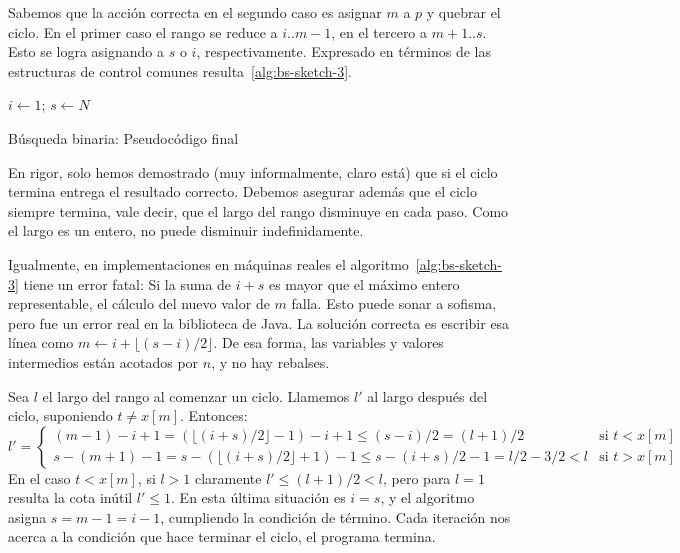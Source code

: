   \noindent
  Sabemos que la acción correcta
  en el segundo caso es asignar \(m\) a \(p\)
  y quebrar el ciclo.
  En el primer caso el rango se reduce a \(i .. m - 1\),
  en el tercero a \(m + 1 .. s\).
  Esto se logra asignando a \(s\) o \(i\),
  respectivamente.
  Expresado en términos de las estructuras de control comunes
  resulta~\ref{alg:bs-sketch-3}.
  \begin{algorithm}
    \DontPrintSemicolon
    \(i \leftarrow 1\); \(s \leftarrow N\) \;
    \caption{Búsqueda binaria: Pseudocódigo final}
    \label{alg:bs-sketch-3}
  \end{algorithm}
  En rigor,
  solo hemos demostrado
  (muy informalmente,
   claro está)
  que si el ciclo termina entrega el resultado correcto.
  Debemos asegurar además que el ciclo siempre termina,
  vale decir,
  que el largo del rango disminuye en cada paso.
  Como el largo es un entero,
  no puede disminuir indefinidamente.

  Igualmente,
  en implementaciones en máquinas reales
  el algoritmo~\ref{alg:bs-sketch-3}
  tiene un error fatal:
  Si la suma de \(i + s\)
  es mayor que el máximo entero representable,
  el cálculo del nuevo valor de \(m\) falla.
  Esto puede sonar a sofisma,
  pero fue un error real en la biblioteca de Java.
  La solución correcta es escribir esa línea como
  \(m \leftarrow i + \lfloor (s - i) / 2 \rfloor\).
  De esa forma,
  las variables y valores intermedios están acotados por \(n\),
  y no hay rebalses.

  Sea \(l\) el largo del rango al comenzar un ciclo.
  Llamemos \(l'\) al largo después del ciclo,
  suponiendo \(t \ne x[m]\).
  Entonces:
  \begin{equation*}
    l'
      = \begin{cases}
	  (m - 1) - i + 1
	    = (\lfloor (i + s) / 2 \rfloor - 1) - i + 1
	    \le (s - i) / 2
	    = (l + 1) / 2 & \text{si \(t < x[m]\)} \\
	  s - (m + 1) - 1
	    = s - (\lfloor (i + s) / 2 \rfloor + 1) - 1
	    \le s - (i + s) / 2 - 1
	    = l / 2 - 3 / 2
	    < l & \text{si \(t > x[m]\)}
	\end{cases}
  \end{equation*}
  En el caso \(t < x[m]\),
  si \(l > 1\) claramente \(l' \le (l + 1) / 2 < l\),
  pero para \(l = 1\) resulta la cota inútil \(l' \le 1\).
  En esta última situación
  es \(i = s\),
  y el algoritmo asigna \(s = m - 1 = i - 1\),
  cumpliendo la condición de término.
  Cada iteración
  nos acerca a la condición que hace terminar el ciclo,
  el programa termina.

